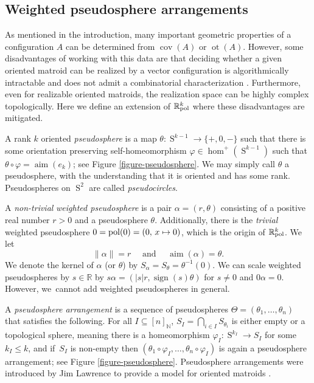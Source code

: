 \documentclass[11pt]{article}
\numberwithin{equation}{section}
\newcommand\mto{\mathchoice{\longmapsto}{\mapsto}{\mapsto}{\mapsto}}
\theoremstyle{remark}
\let\mb\mathbb
\let\df\emph
\let\phi\varphi
\DeclareMathOperator{\sign}{sign}
\DeclareMathOperator{\sphere}{S}
\newcommand{\Rpol}[1]{\mb{R}\mathrlap{{}^{#1}}{}_\text{pol}}
\DeclareMathOperator{\pol}{pol}
\DeclareMathOperator{\aim}{aim}
\DeclareMathOperator{\cov}{cov}
\DeclareMathOperator{\ot}{ot}
\begin{document}
\subsection{Weighted pseudosphere arrangements}\label{subsection-pseudosphere}

As mentioned in the introduction, many important geometric properties of a configuration $A$ can be determined from $\cov(A)$ or $\ot(A)$.
However, some disadvantages of working with this data are that deciding whether a given oriented matroid can be realized by a vector configuration is algorithmically intractable and does not admit a combinatorial characterization \cite{shor1991stretchability,vamos1978missing,mayhew2018yes}. Furthermore, even for realizable oriented matroids, the realization space can be highly complex topologically.
Here we define an extension of $\Rpol{k}$ where these disadvantages are mitigated.

A rank $k$ oriented \df{pseudosphere} is a map $\theta : \sphere^{k-1} \to \{+,0,-\}$ such that there is some orientation preserving self-homeomorphism $\phi \in \hom^+(\sphere^{k-1})$ such that \hbox{$\theta \circ \phi = \aim (e_k)$}; see Figure \ref{figure-pseudosphere}.
We may simply call $\theta$ a pseudosphere, with the understanding that it is oriented and has some rank.
Pseudospheres on $\sphere^2$ are called \df{pseudocircles}.

A \emph{non-trivial} \df{weighted pseudosphere} is a pair $\alpha = (r,\theta)$ consisting of a positive real number $r>0$ and a pseudosphere $\theta$. Additionally, there is the \emph{trivial} weighted pseudosphere $0 =\pol(0) = (0,\, x \mto 0)$, which is the origin of $\Rpol{k}$.
We let
\[\|\alpha\| = r \quad \text{ and } \quad \aim (\alpha) = \theta.\]
We denote the kernel of $\alpha$ (or $\theta$) by $S_\alpha = S_\theta = \theta^{-1}(0)$.
We can scale weighted pseudospheres by $s \in \mb{R}$ by $s \alpha = (|s|r,\sign(s)\theta)$ for $s\neq 0$ and $0\alpha = 0$.
However, we~cannot add weighted pseudospheres in general.

A \df{pseudosphere arrangement} is a sequence of pseudospheres $\Theta = (\theta_1,\dots,\theta_n)$ that satisfies the following.
For all $I \subseteq [n]_\mb{N}$,
$S_I = \bigcap_{i \in I} S_{\theta_i} $ is either empty or a topological sphere, meaning there is a homeomorphism $\phi_I : \sphere^{k_I} \to S_I$ for some $k_I \leq k$,
and if~$S_I$ is non-empty then $(\theta_1 \circ \phi_I,\dots, \theta_n \circ \phi_I)$ is again a pseudosphere arrangement; see Figure \ref{figure-pseudosphere}.
Pseudosphere arrangements were introduced by Jim Lawrence to provide a model for oriented matroids \cite{folkman1978oriented}.
\end{document}
